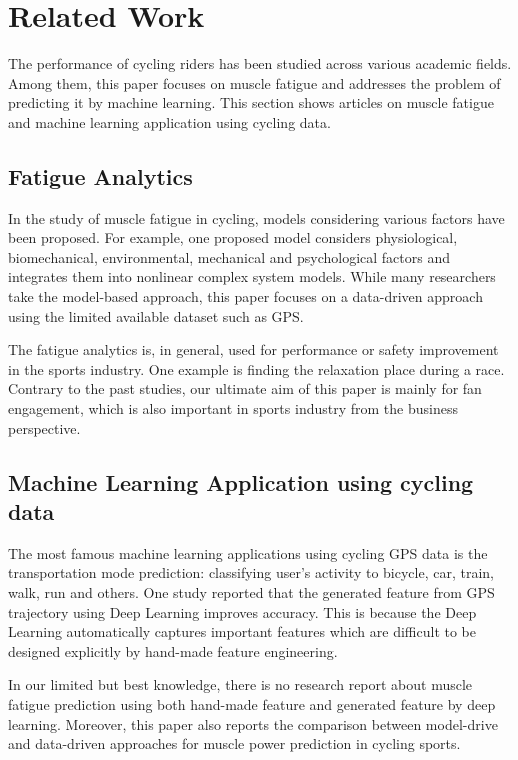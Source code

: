 \documentclass[runningheads]{llncs}
\begin{document}
\section{Related Work}
The performance of cycling riders has been studied across various
academic fields.\cite{ref_1} Among them, this paper focuses on muscle fatigue and
addresses the problem of predicting it by machine learning. This section
shows articles on muscle fatigue and machine learning application using
cycling data.


\subsection{Fatigue Analytics}
In the study of muscle fatigue in cycling, models considering various
factors have been proposed. For example, one proposed model considers
physiological, biomechanical, environmental, mechanical and
psychological factors and integrates them into nonlinear complex system
models.\cite{ref_2} While many researchers take the model-based
approach\cite{ref_3}\cite{ref_4}, this paper focuses on a data-driven
approach using the limited available dataset such as GPS.

The fatigue analytics is, in general, used for performance or safety
improvement in the sports industry. One example is finding the
relaxation place during a race.\cite{ref_5} Contrary to the past
studies, our ultimate aim of this paper is mainly for fan engagement,
which is also important in sports industry from the business
perspective.

\subsection{Machine Learning Application using cycling data}
The most famous machine learning applications using cycling GPS data is
the transportation mode prediction: classifying user's activity to
bicycle, car, train, walk, run and others.\cite{ref_6} One study
reported that the generated feature from GPS trajectory using Deep
Learning improves accuracy.\cite{ref_7} This is because the Deep Learning
automatically captures important features which are difficult to be
designed explicitly by hand-made feature engineering.\cite{ref_8}

In our limited but best knowledge, there is no research report about
muscle fatigue prediction using both hand-made feature and generated
feature by deep learning. Moreover, this paper also reports the
comparison between model-drive and data-driven approaches for muscle
power prediction in cycling sports.
\end{document}
